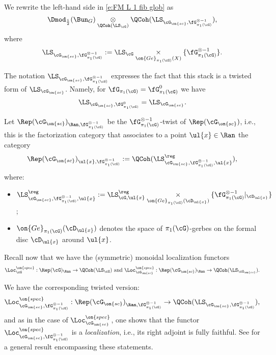 \documentclass[9pt]{amsart}
\theoremstyle{remark}
\theoremstyle{definition}
\theoremstyle{remark}
\numberwithin{equation}{section}
\begin{document}
\sssec{}

We rewrite the left-hand side in \eqref{e:FM L 1 fib glob} as
\begin{equation} \label{e:FM L 1 fib glob LHS}
\Dmod_{\frac{1}{2}}(\Bun_G)\underset{\QCoh(\LS_\cG)}\otimes \QCoh(\LS_{\cG_{\on{sc}},\fG^{\otimes -1}_{\pi_1(\cG)}}),
\end{equation}
where  
$$\LS_{\cG_{\on{sc}},\fG^{\otimes -1}_{\pi_1(\cG)}}:=
\LS_\cG\underset{\on{Ge}_{\pi_1(\cG)}(X)}\times \{\fG^{\otimes -1}_{\pi_1(\cG)}\}.$$ 

The notation $\LS_{\cG_{\on{sc}},\fG^{\otimes -1}_{\pi_1(\cG)}}$ expresses the fact that this stack is a twisted form of $\LS_{\cG_{\on{sc}}}$.
Namely, for $\fG_{\pi_1(\cG)}=\fG^0_{\pi_1(\cG)}$ we have
$$\LS_{\cG_{\on{sc}},\fG^0_{\pi_1(\cG)}}=\LS_{\cG_{\on{sc}}}.$$

\sssec{}

Let $\Rep(\cG_{\on{sc}})_{\Ran,\fG^{\otimes -1}_{\pi_1(\cG)}}$ be the $\fG^{\otimes -1}_{\pi_1(\cG)}$-twist of $\Rep(\cG_{\on{sc}})$, i.e., this is 
the factorization category that associates to a point $\ul{x}\in \Ran$ the category
$$\Rep(\cG_{\on{sc}})_{\ul{x},\fG^{\otimes -1}_{\pi_1(\cG)}}:=\QCoh(\LS^\reg_{\cG_{\on{sc}},\fG^{\otimes -1}_{\pi_1(\cG)},\ul{x}}),$$
where:

\begin{itemize}

\item $\LS^\reg_{\cG_{\on{sc}},\fG^{\otimes -1}_{\pi_1(\cG)},\ul{x}}:=
\LS^\reg_{\cG,\ul{x}}\underset{\on{Ge}_{\pi_1(\cG)}(\cD_{\ul{x}})}\times \{\fG^{\otimes -1}_{\pi_1(\cG)}|_{\cD_{\ul{x}}}\}$;

\medskip

\item $\on{Ge}_{\pi_1(\cG)}(\cD_{\ul{x}})$ denotes the space of $\pi_1(\cG)$-gerbes on the formal disc $\cD_{\ul{x}}$ around $\ul{x}$.

\end{itemize} 

\sssec{}

Recall now that we have the (symmetric) monoidal localization functors
$$\Loc^{\on{spec}}_\cG:\Rep(\cG)_\Ran\to \QCoh(\LS_\cG) \text{ and }
\Loc^{\on{spec}}_{\cG_{\on{sc}}}:\Rep(\cG_{\on{sc}})_\Ran\to \QCoh(\LS_{\cG_{\on{sc}}}).$$

We have the corresponding twisted version:
$$\Loc^{\on{spec}}_{\cG_{\on{sc}},\fG^{\otimes -1}_{\pi_1(\cG)}}:\Rep(\cG_{\on{sc}})_{\Ran,\fG^{\otimes -1}_{\pi_1(\cG)}}\to \QCoh(\LS_{\cG_{\on{sc}},\fG^{\otimes -1}_{\pi_1(\cG)}}),$$
and as in the case of $\Loc^{\on{spec}}_{\cG_{\on{sc}}}$, one shows that the functor $\Loc^{\on{spec}}_{\cG_{\on{sc}},\fG^{\otimes -1}_{\pi_1(\cG)}}$
is a \emph{localization}, i.e., its right adjoint is fully faithful. 
See \cite[Prop. C.1.7]{GLC4} for a general result encompassing
these statements.
\end{document}
